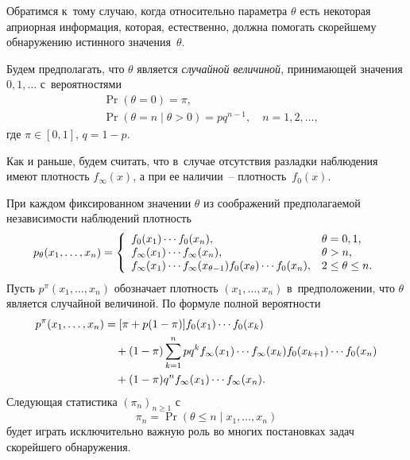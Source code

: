 Обратимся к~тому случаю, когда относительно параметра $\theta$
есть некоторая априорная информация, которая, естественно, должна
помогать скорейшему обнаружению истинного значения~$\theta$.

Будем предполагать, что $\theta$ является \textit{случайной
величиной}, принимающей значения $0,1,\ldots$ с~вероятностями
\begin{equation}
\label{90}%
  \begin{aligned}
    &  \Pr(\theta=0)=\pi,\\
    &  \Pr(\theta=n\mid\theta>0)=pq^{n-1},\quad n=1,2,\ldots,
  \end{aligned}
\end{equation}
где $\pi\in[0,1]$, $q=1-p$.

Как и раньше, будем считать, что в~случае отсутствия разладки
наблюдения имеют плотность $f_{\infty}(x)$, а при ее наличии~--
плотность~$f_0(x)$.

При каждом фиксированном значении $\theta$ из соображений
предполагаемой независимости наблюдений плотность
\begin{equation}
\label{91}%
    p_{\theta}(x_1,\ldots,x_n)=\left\{%
\begin{array}{ll}
    f_0(x_1)\cdots f_0(x_n), & \hbox{$\theta=0,1$,} \\
    f_{\infty}(x_1)\cdots f_{\infty}(x_n), & \hbox{$\theta>n$,} \\
    f_{\infty}(x_1)\cdots f_{\infty}(x_{\theta-1})
    f_0(x_{\theta})\cdots f_0(x_n), & \hbox{$2\le\theta\le n$.} \\
\end{array}%
\right.
\end{equation}
Пусть $p^{\pi}(x_1,\ldots,x_n)$ обозначает плотность
$(x_1,\ldots,x_n)$ в~предположении, что $\theta$ является
случайной величиной. По формуле полной вероятности
\begin{align}
\label{92}%
p^{\pi}(x_1,\ldots,x_n)
 &
    =[\pi+p(1-\pi)]f_0(x_1)\cdots f_0(x_k)\notag\\
 &\quad
    +(1-\pi)\sum_{k=1}^npq^kf_\infty(x_1)\cdots f_\infty(x_k)
    f_0(x_{k+1})\cdots f_0(x_n)\notag\\
 &\quad
    +(1-\pi)q^nf_{\infty}(x_1)\cdots f_{\infty}(x_n).
\end{align}
Следующая статистика $(\pi_n)_{n\ge1}$ с~\begin{equation}
\label{93}%
    \pi_n=\Pr(\theta\le n\mid x_1,\ldots,x_n)
\end{equation}
будет играть исключительно важную роль во многих постановках задач
скорейшего обнаружения.

